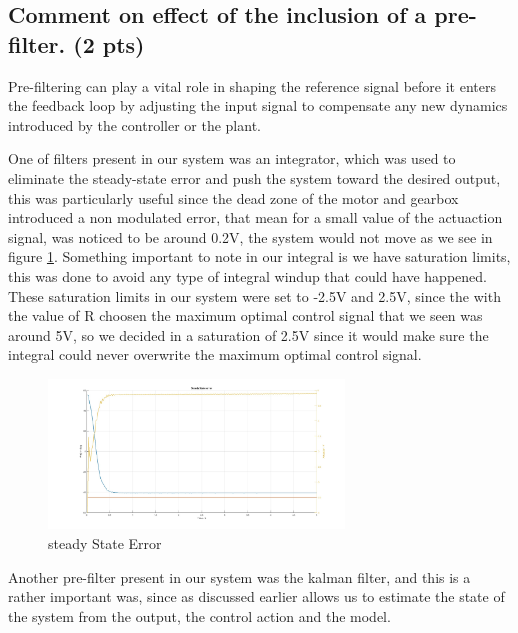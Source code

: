 \subsection{Comment on effect of the inclusion of a pre-filter. (2 pts)}
\vspace{10pt}


Pre-filtering can play a vital role in shaping the reference signal before it enters the feedback loop by adjusting the input signal to compensate any new dynamics introduced by the controller or the plant. 

One of filters present in our system was an integrator, which was used to eliminate the steady-state error and push the system toward the desired output, this was particularly useful since the dead zone of the motor and gearbox introduced a non modulated error, that mean for a small value of the actuaction signal, was noticed to be around 0.2V,  the system would not move as we see in figure \ref{fig: Steady state error}. Something important to note in our integral is we have saturation limits, this was done to avoid any type of integral windup that could have happened. These saturation limits in our system were set to -2.5V and 2.5V, since the with the value of R choosen the maximum optimal control signal that we seen was around 5V, so we decided in a saturation of 2.5V since it would make sure the integral could never overwrite the maximum optimal control signal.  

\begin{figure}
    \includegraphics[width=0.7\textwidth]{Figs/steadyStateError.jpg}
    \caption{steady State Error}
    \label{fig: Steady state error}
\end{figure}

Another pre-filter present in our system was the kalman filter, and this is a rather important was, since as discussed earlier allows us to estimate the state of the system from the output, the control action and the model. 